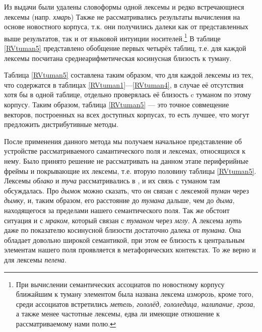 \par Из выдачи были удалены словоформы одной лексемы и редко встречающиеся лексемы (напр. \textit{хмарь}) Также не рассматривались результаты вычисления на основе новостного корпуса, т.к. они получились далеки как от представленных выше результатов, так и от языковой интуиции носителей.\footnote{При вычислении семантических ассоциатов по новостному корпусу ближайшим к туману элементом была названа лексема \textit{изморозь}, кроме того, среди ассоциатов встретились \textit{метель, гололёд, гололедица, налипание, гроза}, а также менее частотные лексемы, едва ли имеющие отношение к рассматриваемому нами полю.} В таблице \ref{RVtuman5} представлено обобщение первых четырёх таблиц, т.е. для каждой лексемы посчитана среднеарифметическая косинусная близость к туману.


\par Таблица \ref{RVtuman5} составлена таким образом, что для каждой лексемы из тех, что содержатся в таблицах \ref{RVtuman1}---\ref{RVtuman4}, в случае её отсутствия хотя бы в одной таблице, отдельно проверялась её близость c туманом по этому корпусу. Таким образом, таблица \ref{RVtuman5} --- это точное совмещение векторов, построенных на всех доступных корпусах, то есть лучшее, что могут предложить дистрибутивные методы.

\par После применения данного метода мы получаем начальное представление об устройстве рассматриваемого самантического поля и лексемах, относящихся к нему. Было принято решение не рассматривать на данном этапе периферийные фреймы и покрывающие их лексемы, т.е. вторую половину таблицы \ref{RVtuman5}. Лексемы \textit{облако} и \textit{туча} рассматривались в \citep{соколовский2017}, и их связь с туманом там обсуждалась. Про \textit{дымок} можно сказать, что он связан с лексемой \textit{туман} через \textit{дымку}, и, таким образом, его расстояние до \textit{тумана} дальше, чем до \textit{дыма}, находящегося за пределами нашего семантического поля. Так же обстоит ситуация и с \textit{мраком}, который связан с \textit{туманом} через \textit{мглу}. А лексема \textit{муть} даже по показателю косинусной близости достаточно далека от \textit{тумана}. Она обладает довольно широкой семантикой, при этом ее близость к центральным элементам нашего поля проявляется в метафорических контекстах. То же верно и для лексемы \textit{пелена}.

